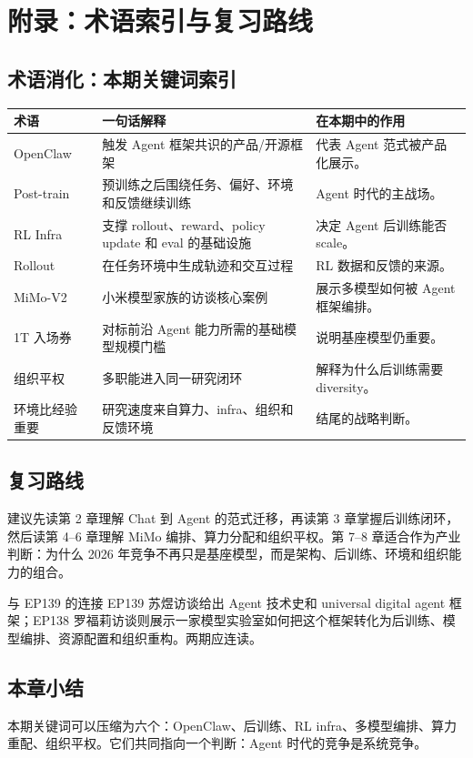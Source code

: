 \section{附录：术语索引与复习路线}

\subsection{术语消化：本期关键词索引}

\noindent\begin{longtable}{p{}p{}p{}}
\toprule
术语 & 一句话解释 & 在本期中的作用 \\
\midrule
OpenClaw & 触发 Agent 框架共识的产品/开源框架 & 代表 Agent 范式被产品化展示。 \\
Post-train & 预训练之后围绕任务、偏好、环境和反馈继续训练 & Agent 时代的主战场。 \\
RL Infra & 支撑 rollout、reward、policy update 和 eval 的基础设施 & 决定 Agent 后训练能否 scale。 \\
Rollout & 在任务环境中生成轨迹和交互过程 & RL 数据和反馈的来源。 \\
MiMo-V2 & 小米模型家族的访谈核心案例 & 展示多模型如何被 Agent 框架编排。 \\
1T 入场券 & 对标前沿 Agent 能力所需的基础模型规模门槛 & 说明基座模型仍重要。 \\
组织平权 & 多职能进入同一研究闭环 & 解释为什么后训练需要 diversity。 \\
环境比经验重要 & 研究速度来自算力、infra、组织和反馈环境 & 结尾的战略判断。 \\
\bottomrule
\end{longtable}

\subsection{复习路线}

建议先读第 2 章理解 Chat 到 Agent 的范式迁移，再读第 3 章掌握后训练闭环，然后读第 4--6 章理解 MiMo 编排、算力分配和组织平权。第 7--8 章适合作为产业判断：为什么 2026 年竞争不再只是基座模型，而是架构、后训练、环境和组织能力的组合。

\begin{knowledgebox}{与 EP139 的连接}
EP139 苏煜访谈给出 Agent 技术史和 universal digital agent 框架；EP138 罗福莉访谈则展示一家模型实验室如何把这个框架转化为后训练、模型编排、资源配置和组织重构。两期应连读。
\end{knowledgebox}

\subsection{本章小结}

本期关键词可以压缩为六个：OpenClaw、后训练、RL infra、多模型编排、算力重配、组织平权。它们共同指向一个判断：Agent 时代的竞争是系统竞争。


